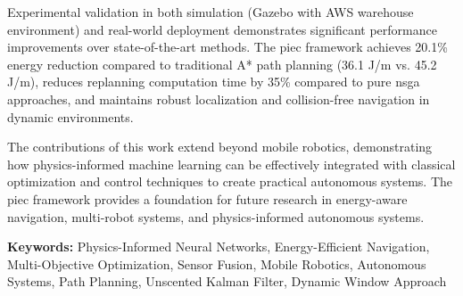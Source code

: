 Experimental validation in both simulation (Gazebo with AWS warehouse environment) and real-world deployment demonstrates significant performance improvements over state-of-the-art methods. The \acrshort{piec} framework achieves 20.1\% energy reduction compared to traditional A* path planning (36.1 J/m vs. 45.2 J/m), reduces replanning computation time by 35\% compared to pure \acrshort{nsga} approaches, and maintains robust localization and collision-free navigation in dynamic environments.

The contributions of this work extend beyond mobile robotics, demonstrating how physics-informed machine learning can be effectively integrated with classical optimization and control techniques to create practical autonomous systems. The \acrshort{piec} framework provides a foundation for future research in energy-aware navigation, multi-robot systems, and physics-informed autonomous systems.

\textbf{Keywords:} Physics-Informed Neural Networks, Energy-Efficient Navigation, Multi-Objective Optimization, Sensor Fusion, Mobile Robotics, Autonomous Systems, Path Planning, Unscented Kalman Filter, Dynamic Window Approach
